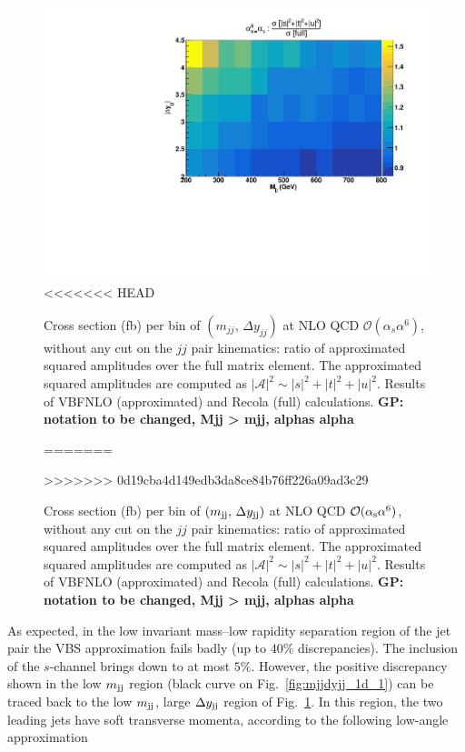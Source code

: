\begin{figure}[hbt]
\centering
{\includegraphics[scale=0.39]{figures/scanfigures/a6as_vbfnloVSrecola_stu.pdf}}
<<<<<<< HEAD
\caption{Cross section (fb) per bin of $(m_{jj},\,\Delta y_{jj})$ at NLO QCD $\mathcal{O}(\alpha_s\alpha^6)$, without any cut on the $jj$ pair kinematics:  ratio of approximated squared amplitudes over the full matrix element. The approximated squared amplitudes are computed as $|\mathcal{A}|^2 \sim |s|^2 + |t|^2 + |u|^2$. Results of {\sc VBFNLO} (approximated) and {\sc Recola} (full) calculations. {\bf GP: notation to be changed, Mjj > mjj, alphas alpha}}\label{fig:mjjdyjj_2d_NLO}
=======
\caption{Cross section (fb) per bin of $(m_{\text{j}\text{j}},\,\Delta y_{\text{j}\text{j}})$ at NLO QCD $\mathcal{O}(\alpha_\text{s}\alpha^6)$, without any cut on the $jj$ pair kinematics:  ratio of approximated squared amplitudes over the full matrix element. The approximated squared amplitudes are computed as $|\mathcal{A}|^2 \sim |s|^2 + |t|^2 + |u|^2$. Results of {\sc VBFNLO} (approximated) and {\sc Recola} (full) calculations. {\bf GP: notation to be changed, Mjj > mjj, alphas alpha}}\label{fig:mjjdyjj_2d_NLO}
>>>>>>> 0d19cba4d149edb3da8ce84b76ff226a09ad3c29
\end{figure}

As expected, in the low invariant mass--low rapidity separation region of the jet pair the VBS approximation fails badly (up to $40\%$ discrepancies).
The inclusion of the $s$-channel brings down to at most $5\%$.
However, the positive discrepancy shown in the low $m_{\text{j}\text{j}}$ region (black curve on Fig.~\ref{fig:mjjdyjj_1d_1}) can be traced back to the low $m_{\text{j}\text{j}}$, large $\Delta y_{\text{j}\text{j}}$ region of Fig.~\ref{fig:mjjdyjj_2d_NLO}.
In this region, the two leading jets have soft transverse momenta, according to the following low-angle approximation

